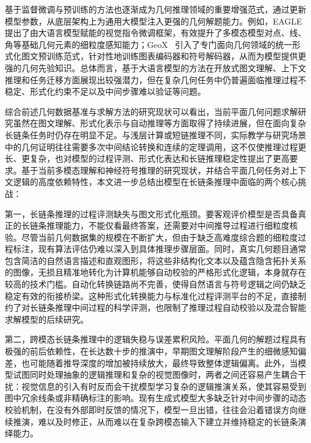 基于监督微调与预训练的方法也逐渐成为几何推理领域的重要增强范式，通过更新模型参数，从底层架构上为通用大模型注入更强的几何解题能力。例如，EAGLE~\cite{li2024eagle} 提出了由大语言模型赋能的视觉指令微调框架，有效提升了多模态模型对点、线、角等基础几何元素的细粒度感知能力；GeoX~\cite{xia2024geox} 引入了专门面向几何领域的统一形式化图文预训练范式，针对性地训练图表编码器和符号解码器，从而为模型提供更强的几何先验知识。总体而言，基于大语言模型的方法在开放式图文理解、上下文推理和任务迁移方面展现出较强潜力，但在复杂几何任务中仍普遍面临推理过程不稳定、形式化约束不足以及中间步骤难以验证等问题。


综合前述几何数据基准与求解方法的研究现状可以看出，当前平面几何问题求解研究虽然在图文理解、形式化表示与自动推理等方面取得了持续进展，但在面向复杂长链条任务时仍存在明显不足。与浅层计算或短链推理不同，实际教学与研究场景中的几何证明往往需要多次中间结论转换和连续的定理调用，这不仅使推理过程更长、更复杂，也对模型的过程评测、形式化表达和长链推理稳定性提出了更高要求。基于当前多模态理解和神经符号推理的研究现状，并结合平面几何任务对上下文逻辑的高度依赖特性，本文进一步总结出模型在长链条推理中面临的两个核心挑战：

第一，长链条推理的过程评测缺失与图文形式化瓶颈。要客观评价模型是否具备真正的长链条推理能力，不能仅看最终答案，还需要对中间推导过程进行细粒度核验。尽管当前几何数据集的规模在不断扩大，但由于缺乏高难度综合题的细粒度过程标注，现有算法评估仍难以深入到具体推理步骤层面。同时，真实几何题目通常包含简洁的自然语言描述和直观图形，将这些非结构化文本以及蕴含隐含拓扑关系的图像，无损且精准地转化为计算机能够自动校验的严格形式化逻辑，本身就存在较高的技术门槛。自动化转换链路尚不完善，使得自然语言与符号逻辑之间仍缺乏稳定有效的衔接桥梁。这种形式化转换能力与标准化过程评测平台的不足，直接制约了对长链条推理中间过程的科学评测，也限制了推理过程自动校验以及混合智能求解模型的后续研究。

第二，跨模态长链条推理中的逻辑失稳与误差累积风险。平面几何的解题过程具有极强的前后依赖性，在长达数十步的推演中，早期图文理解阶段产生的细微感知偏差，也可能随着推导深度的增加被持续放大，最终导致整体逻辑偏离。此外，当模型试图同时处理抽象的逻辑推理和复杂的视觉图像时，两者之间还容易产生耦合干扰：视觉信息的引入有时反而会干扰模型学习复杂的逻辑推演关系，使其容易受到图中冗余线条或非精确标注的影响。现有生成式模型大多缺乏针对中间步骤的动态校验机制，在没有外部即时反馈的情况下，模型一旦出错，往往会沿着错误方向继续推演，难以及时修正，从而难以在复杂跨模态输入下建立并维持稳定的长链条演绎能力。


